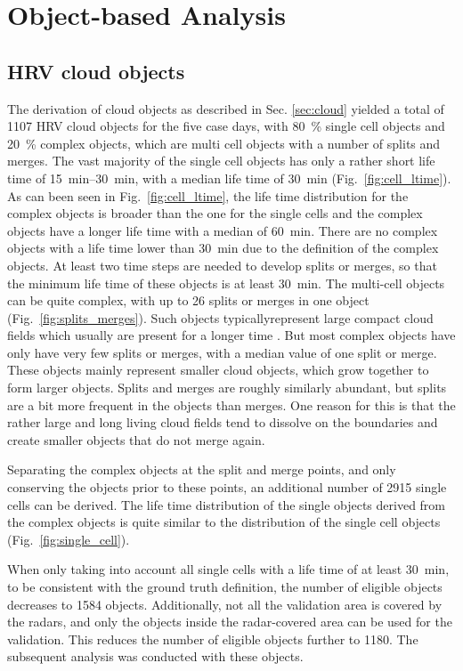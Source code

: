 \chapter{Object-based Analysis}

\section{HRV cloud objects}
The derivation of cloud objects as described in Sec. \ref{sec:cloud} yielded a total of \num{1107} HRV cloud objects for the five case days, with \SI{80}{\percent} single cell objects and \SI{20}{\percent} complex objects, which are multi cell objects with a number of splits and merges. The vast majority of the single cell objects has only a rather short life time of \SIrange{15}{30}{\minute}, with a median life time of \SI{30}{\minute} (Fig.~\ref{fig:cell_ltime}). As  can been seen in Fig.~\ref{fig:cell_ltime}, the life time distribution for the complex objects is broader than the one for the single cells and the complex objects  have a longer life time with a median of \SI{60}{\minute}. There are no complex objects with a life time  lower than \SI{30}{\minute}  due to the definition of the complex objects.  At least two time steps are needed to develop splits or merges, so that the minimum life time of these objects is at least \SI{30}{\minute}. The multi-cell objects can be quite complex, with up to \num{26} splits or merges in one object (Fig.~\ref{fig:splits_merges}). Such objects typicallyrepresent large compact cloud fields which usually are present for a longer time . But most complex objects have only have very few splits or merges, with a median value of one split or merge. These objects mainly represent smaller cloud objects, which grow together to form larger objects. Splits and merges are roughly similarly abundant, but splits are a bit more frequent in the objects than merges. One reason for this is that the rather large and long living cloud fields tend to dissolve on the boundaries and  create smaller objects that do not merge again.

Separating the complex objects at the split and merge points, and only conserving the objects prior to these points, an additional number of \num{2915} single cells can be derived. The life time distribution of the single objects derived from the complex objects is quite similar to the distribution of the single cell objects (Fig.~\ref{fig:single_cell}).

When only taking into account all single cells with a life time of at least \SI{30}{\minute}, to be consistent with the ground truth definition, the number of eligible objects decreases to \num{1584} objects. Additionally, not all the validation area is covered by the radars, and only the objects inside the radar-covered area can be used for the validation. This reduces the number of eligible objects further to 1180. The subsequent analysis was conducted with these objects.

